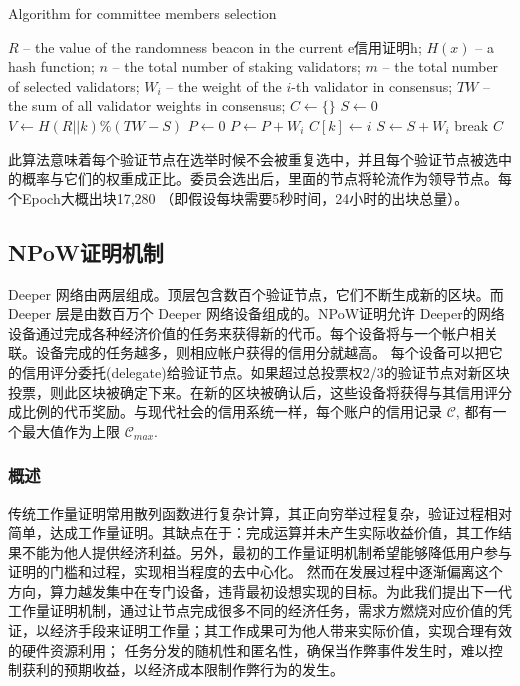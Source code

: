 \documentclass[a4paper]{article}
\begin{document}
\begin{algorithm} [hh]
\caption{Algorithm for committee members selection}
\label{alg:vdf-selection}
\begin{algorithmic} [1]
\State $R$ -- the value of the randomness beacon in the current e信用证明h;
\State $H(x)$ -- a hash function;
\State $n$ -- the total number of staking validators;
\State $m$ -- the total number of selected validators;
\State $W_i$ -- the weight of the $i$-th validator in consensus;
\State $TW$ -- the sum of all validator weights in consensus;
\State
\State $C \leftarrow \{\}$
\State $S \leftarrow 0$
    \State $V \leftarrow H(R||k) \% (TW-S)$
    \State $P \leftarrow 0$
        \State $P \leftarrow P + W_i$
            \State $C[k] \leftarrow i$
            \State $S \leftarrow S + W_i$
            \State break
        \EndIf
    \EndFor
\EndFor
\State \Return $C$
\end{algorithmic}
\end{algorithm}

此算法意味着每个验证节点在选举时候不会被重复选中，并且每个验证节点被选中的概率与它们的权重成正比。委员会选出后，里面的节点将轮流作为领导节点。每个Epoch大概出块17,280 （即假设每块需要5秒时间，24小时的出块总量）。

\vfill
\newpage

\subsection{NPoW证明机制}
Deeper 网络由两层组成。顶层包含数百个验证节点，它们不断生成新的区块。而 Deeper 层是由数百万个 Deeper 网络设备组成的。NPoW证明允许 Deeper的网络设备通过完成各种经济价值的任务来获得新的代币。每个设备将与一个帐户相关联。设备完成的任务越多，则相应帐户获得的信用分就越高。
每个设备可以把它的信用评分委托(delegate)给验证节点。如果超过总投票权2/3的验证节点对新区块投票，则此区块被确定下来。在新的区块被确认后，这些设备将获得与其信用评分成比例的代币奖励。与现代社会的信用系统一样，每个账户的信用记录 $\mathcal{C}$, 都有一个最大值作为上限 $\mathcal{C}_{max}$.

\subsubsection{概述}
传统工作量证明常用散列函数进行复杂计算，其正向穷举过程复杂，验证过程相对简单，达成工作量证明。其缺点在于：完成运算并未产生实际收益价值，其工作结果不能为他人提供经济利益。另外，最初的工作量证明机制希望能够降低用户参与证明的门槛和过程，实现相当程度的去中心化。
然而在发展过程中逐渐偏离这个方向，算力越发集中在专门设备，违背最初设想实现的目标。为此我们提出下一代工作量证明机制，通过让节点完成很多不同的经济任务，需求方燃烧对应价值的凭证，以经济手段来证明工作量；其工作成果可为他人带来实际价值，实现合理有效的硬件资源利用；
任务分发的随机性和匿名性，确保当作弊事件发生时，难以控制获利的预期收益，以经济成本限制作弊行为的发生。
\end{document}
